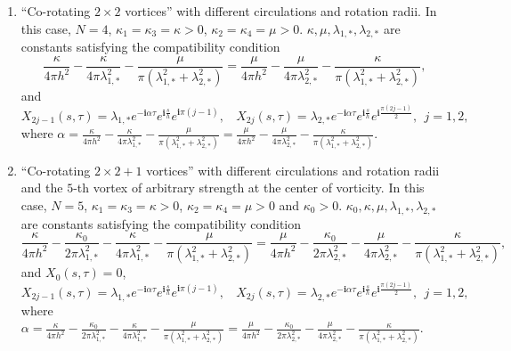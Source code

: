 \documentclass[12pt,reqno]{amsart}
\numberwithin{equation}{section}
\theoremstyle{definition}
\newenvironment{customthm}[1]
{\renewcommand\theinnercustomthm{#1}\innercustomthm}
{\endinnercustomthm}
\theoremstyle{remark}
\begin{document}
\begin{customthm}{A.1}
\begin{enumerate}
\item[\textbf{Case 4:}] ``Co-rotating  $  2\times2  $ vortices'' with different circulations and rotation radii. In this case, $ N= 4 $, $ \kappa_1=\kappa_3=\kappa>0 $, $ \kappa_2=\kappa_4=\mu>0$. $ \kappa,\mu, \lambda_{1,*},\lambda_{2,*}  $ are constants satisfying the compatibility condition
\begin{equation*} 
\frac{\kappa}{4\pi h^2} -\frac{\kappa}{4\pi \lambda_{1,*}^2} -\frac{\mu}{\pi \left (\lambda_{1,*}^2+\lambda_{2,*}^2\right )}=\frac{\mu}{4\pi h^2} -\frac{\mu}{4\pi \lambda_{2,*}^2} -\frac{\kappa}{\pi \left (\lambda_{1,*}^2+\lambda_{2,*}^2\right )},
\end{equation*}
and
\begin{equation*} 
X_{2j-1}(s,\tau)=\lambda_{1,*}e^{-\mathbf{i}\alpha\tau}e^{\mathbf{i}\frac{s}{h}}e^{\mathbf{i}\pi(j-1)},\ \ \ \ 	X_{2j}(s,\tau)=\lambda_{2,*}e^{-\mathbf{i}\alpha\tau}e^{\mathbf{i}\frac{s}{h}}e^{\mathbf{i}\frac{\pi(2j-1)}{2}},\ \ j=1,2,
\end{equation*}
where $ \alpha=\frac{\kappa}{4\pi h^2} -\frac{\kappa}{4\pi \lambda_{1,*}^2} -\frac{\mu}{\pi \left (\lambda_{1,*}^2+\lambda_{2,*}^2\right )}=\frac{\mu}{4\pi h^2} -\frac{\mu}{4\pi \lambda_{2,*}^2} -\frac{\kappa}{\pi \left (\lambda_{1,*}^2+\lambda_{2,*}^2\right )}  $.
\item[\textbf{Case 5:}] ``Co-rotating  $  2\times2+1  $ vortices'' with different circulations and rotation radii and the $ 5 $-th vortex of arbitrary strength
at the center of vorticity. In this case, $ N= 5 $, $ \kappa_1=\kappa_3=\kappa>0 $, $ \kappa_2=\kappa_4=\mu>0$ and $ \kappa_0>0 $. $ \kappa_0,\kappa,\mu, \lambda_{1,*},\lambda_{2,*}  $ are constants satisfying the compatibility condition
\begin{equation*} 
\frac{\kappa}{4\pi h^2}-\frac{\kappa_0}{2\pi \lambda_{1,*}^2} -\frac{\kappa}{4\pi \lambda_{1,*}^2} -\frac{\mu}{\pi \left (\lambda_{1,*}^2+\lambda_{2,*}^2\right )}=\frac{\mu}{4\pi h^2}-\frac{\kappa_0}{2\pi \lambda_{2,*}^2} -\frac{\mu}{4\pi \lambda_{2,*}^2} -\frac{\kappa}{\pi \left (\lambda_{1,*}^2+\lambda_{2,*}^2\right )},
\end{equation*}
and $ X_0(s,\tau)=0 $,
\begin{equation*} 
X_{2j-1}(s,\tau)=\lambda_{1,*}e^{-\mathbf{i}\alpha\tau}e^{\mathbf{i}\frac{s}{h}}e^{\mathbf{i}\pi(j-1)},\ \ \ \ 	X_{2j}(s,\tau)=\lambda_{2,*}e^{-\mathbf{i}\alpha\tau}e^{\mathbf{i}\frac{s}{h}}e^{\mathbf{i}\frac{\pi(2j-1)}{2}},\ \ j=1,2,
\end{equation*}
where $ \alpha=\frac{\kappa}{4\pi h^2}-\frac{\kappa_0}{2\pi \lambda_{1,*}^2} -\frac{\kappa}{4\pi \lambda_{1,*}^2} -\frac{\mu}{\pi \left (\lambda_{1,*}^2+\lambda_{2,*}^2\right )}=\frac{\mu}{4\pi h^2}-\frac{\kappa_0}{2\pi \lambda_{2,*}^2} -\frac{\mu}{4\pi \lambda_{2,*}^2} -\frac{\kappa}{\pi \left (\lambda_{1,*}^2+\lambda_{2,*}^2\right )}  $.
\end{enumerate}
 
\end{customthm}
\end{document}
